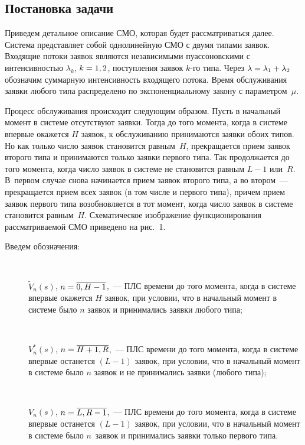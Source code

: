 \begin{multicols}{2}
\vspace*{-4pt}

\section{Постановка задачи}
\vspace*{-2pt}

Приведем детальное описание СМО, которая будет рассматриваться далее. Система 
представляет собой однолинейную СМО с двумя типами заявок. Входящие потоки 
заявок являются независимыми пуассоновскими с интенсивностью $\lambda_k$,  
$k\hm=1,2$, поступления заявок $k$-го типа. Через $\lambda\hm=\lambda_1\hm+\lambda_2$ обозначим 
суммарную интенсивность входящего потока. Время обслуживания заявки любого типа 
распределено по экспоненциальному закону с параметром~$\mu$.

Процесс обслуживания происходит следующим образом. Пусть в начальный
момент в системе отсутствуют заявки. Тогда до того момента, когда в
системе впервые окажется $H$ заявок, к обслуживанию принимаются
заявки обоих типов. Но как только число заявок становится равным~$H$, 
прекращается прием заявок второго типа и принимаются только
заявки первого типа. Так продолжается до того момента, когда число
заявок в системе не становится равным $L-1$ или~$R$. В~первом случае
снова начинается прием заявок второго типа, а во втором~---
прекращается прием всех заявок (в том числе и первого типа), причем
прием заявок первого типа возобновляется в тот момент, когда число
заявок в системе становится равным~$H$. Схематическое изображение
функционирования рассматриваемой СМО приведено на рис.~1.

Введем обозначения:
\begin{description}
\item[\,] $\tilde {V}_n(s)$,  $n\hm=\overline{0,H-1}$,~--- ПЛС времени до того
момента, когда в системе впервые окажется $H$ заявок, при условии,
что в начальный момент в системе было $n$ заявок и принимались
заявки любого типа;
\item[\,]
$V^*_n(s)$, $n\hm=\overline{H+1,R}$,~--- ПЛС времени до того
момента, когда в системе впервые останется $(L-1)$ заявок, при
условии, что в начальный момент в системе было $n$ заявок и не
принимались заявки (любого типа);
\item[\,]
$V_n(s)$, $n\hm=\overline{L,R-1}$,~--- ПЛС времени до того момента,
когда в системе впервые останется $(L-1)$ заявок, при условии, что в
начальный момент в сис\-те\-ме было $n$~заявок и принимались заявки
только первого типа.
\end{description}


\end{multicols}

